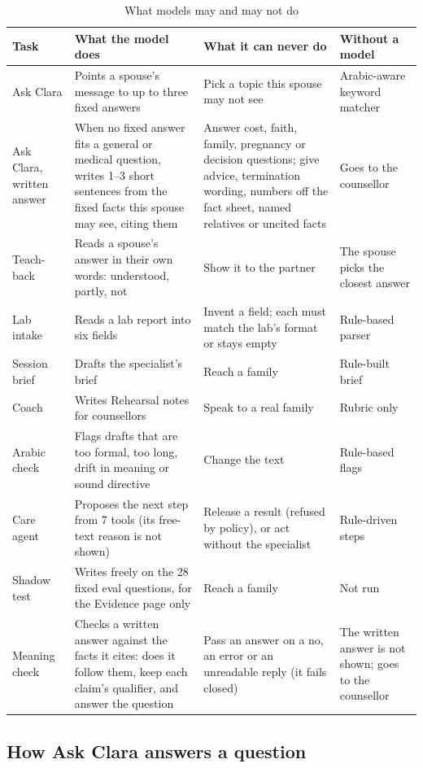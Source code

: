 \documentclass[10.5pt,a4paper]{article}
\newcommand{\thead}[1]{\textbf{#1}}
\newcommand{\toprl}{\arrayrulecolor{ink}\toprule\arrayrulecolor{rule}}
\begin{document}
{\small
\begin{xltabular}{\textwidth}{@{}P{2.4cm}LLP{2.8cm}@{}}
\caption{What models may and may not do}\\
\toprl
\thead{Task} & \thead{What the model does} & \thead{What it can never do} & \thead{Without a model}\\
\midrule
Ask Clara & Points a spouse's message to up to three fixed answers & Pick a topic this spouse may not see & Arabic-aware keyword matcher\\
\midrule
Ask Clara, written answer & When no fixed answer fits a general or medical question, writes 1--3 short sentences from the fixed facts this spouse may see, citing them & Answer cost, faith, family, pregnancy or decision questions; give advice, termination wording, numbers off the fact sheet, named relatives or uncited facts & Goes to the counsellor\\
\midrule
Teach-back & Reads a spouse's answer in their own words: understood, partly, not & Show it to the partner & The spouse picks the closest answer\\
\midrule
Lab intake & Reads a lab report into six fields & Invent a field; each must match the lab's format or stays empty & Rule-based parser\\
\midrule
Session brief & Drafts the specialist's brief & Reach a family & Rule-built brief\\
\midrule
Coach & Writes Rehearsal notes for counsellors & Speak to a real family & Rubric only\\
\midrule
Arabic check & Flags drafts that are too formal, too long, drift in meaning or sound directive & Change the text & Rule-based flags\\
\midrule
Care agent & Proposes the next step from 7 tools (its free-text reason is not shown) & Release a result (refused by policy), or act without the specialist & Rule-driven steps\\
\midrule
Shadow test & Writes freely on the 28 fixed eval questions, for the Evidence page only & Reach a family & Not run\\
\midrule
Meaning check & Checks a written answer against the facts it cites: does it follow them, keep each claim's qualifier, and answer the question & Pass an answer on a no, an error or an unreadable reply (it fails closed) & The written answer is not shown; goes to the counsellor\\
\bottomrule
\end{xltabular}}

\subsection{How Ask Clara answers a question}
\end{document}
